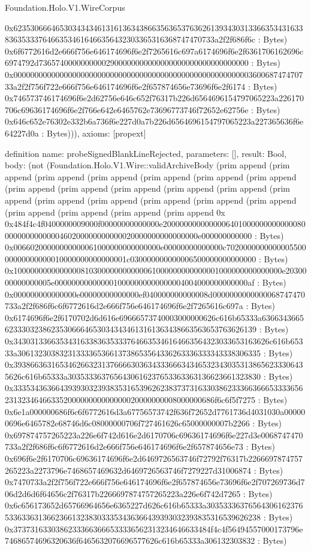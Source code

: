 \begin{lexlean}{Foundation.Holo.V1.WireCorpus}
\begin{semanticmodule}
{0x62353066646530343434613161363438663563653763626139343031336635343163383635333764663534616466356432303365316368747470733a2f2f686f6c : Bytes) 0x6f6772616d2e666f756e646174696f6e2f7265616c697a6174696f6e2f6361706162696c6974792d73657400000000002900000000000000000000000000000000 : Bytes) 0x00000000000000000000000000000000000000000000000000000000360068747470733a2f2f756f722e666f756e646174696f6e2f657874656e73696f6e2f6174 : Bytes) 0x746573746174696f6e2d62756e646c652f76317b226d6564696154797065223a226170706c69636174696f6e2f766e642e6465762e73696773746f72652e62756e : Bytes) 0x646c652e76302e332b6a736f6e227d0a7b226d6564696154797065223a227365636f6e64227d0a : Bytes))),
  axioms: [propext]
}

definition{
  name: probeSignedBlankLineRejected,
  parameters: [],
  result: Bool,
  body: (not (Foundation.Holo.V1.Wire::validArchiveBody (prim append (prim append (prim append (prim append (prim append (prim append (prim append (prim append (prim append (prim append (prim append (prim append (prim append (prim append (prim append (prim append (prim append (prim append (prim append (prim append (prim append (prim append 0x 0x484f4c4f0400000009000f00000000000000e20000000000000064010000000000000800000000000000460200000000000020000000000000000e000000000000 : Bytes) 0x00660200000000000061000000000000000e00000000000000c702000000000000550000000000000010000000000000001c030000000000006500000000000000 : Bytes) 0x1000000000000000810300000000000061000000000000001000000000000000e2030000000000005e0000000000000010000000000000004004000000000000af : Bytes) 0x000000000000000e00000000000000ef040000000000008d0000000000000068747470733a2f2f686f6c6f6772616d2e666f756e646174696f6e2f7265616c697a : Bytes) 0x6174696f6e2f6170702d6d616e69666573740003000000626c616b65333a6366343665623330323862353066646530343434613161363438663563653763626139 : Bytes) 0x3430313366353431633836353337646635346164663564323033653163626c616b65333a3061323038323133336536613738653564336263336333343338306335 : Bytes) 0x3938663631653462663231376666303634333666343465323430353138656233306435626c616b65333a3035333637656430616237653363363136623661323830 : Bytes) 0x33353436366439393032393835316539626238373731633038623336636665333365623132346466335200000000000000020000000008000000686f6c6f5f7275 : Bytes) 0x6e1a000000686f6c6f6772616d3a67756573742f636f72652d7761736d4031030a000000696e6465782e68746d6c08000000706f727461626c65000000007b2266 : Bytes) 0x697874757265223a226e6f742d616e2d6170706c69636174696f6e227d3e0068747470733a2f2f686f6c6f6772616d2e666f756e646174696f6e2f657874656e73 : Bytes) 0x696f6e2f6170706c69636174696f6e2d6469726563746f72792f76317b2266697874757265223a2273796e7468657469632d6469726563746f7279227d31006874 : Bytes) 0x7470733a2f2f756f722e666f756e646174696f6e2f657874656e73696f6e2f707269736d706d2d6d6f64656c2f76317b2266697874757265223a226e6f742d7265 : Bytes) 0x6c656173652d65766964656e6365227d626c616b65333a303533363765643061623765336336313662366132383033353436366439393032393835316539626238 : Bytes) 0x37373163303862333663666533336562313234646633484f4c4f56494557000173796e74686574696320636f6465632076696577626c616b65333a306132303832 : Bytes) }
\end{semanticmodule}
\end{lexlean}
